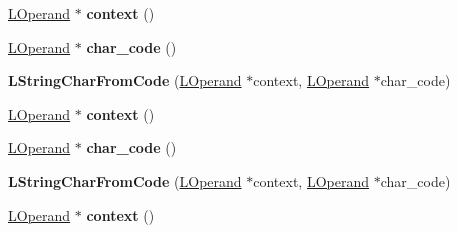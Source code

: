 \begin{DoxyCompactItemize}
\item 
\hyperlink{classv8_1_1internal_1_1_l_operand}{L\+Operand} $\ast$ {\bfseries context} ()\hypertarget{classv8_1_1internal_1_1_l_string_char_from_code_a4356472324b4b7a5d7ffebc9b5db601a}{}\label{classv8_1_1internal_1_1_l_string_char_from_code_a4356472324b4b7a5d7ffebc9b5db601a}

\item 
\hyperlink{classv8_1_1internal_1_1_l_operand}{L\+Operand} $\ast$ {\bfseries char\+\_\+code} ()\hypertarget{classv8_1_1internal_1_1_l_string_char_from_code_a93cc7e1f404a16531d549201415f09e1}{}\label{classv8_1_1internal_1_1_l_string_char_from_code_a93cc7e1f404a16531d549201415f09e1}

\item 
{\bfseries L\+String\+Char\+From\+Code} (\hyperlink{classv8_1_1internal_1_1_l_operand}{L\+Operand} $\ast$context, \hyperlink{classv8_1_1internal_1_1_l_operand}{L\+Operand} $\ast$char\+\_\+code)\hypertarget{classv8_1_1internal_1_1_l_string_char_from_code_a0b0f2d230156e96656bb7d58558684a4}{}\label{classv8_1_1internal_1_1_l_string_char_from_code_a0b0f2d230156e96656bb7d58558684a4}

\item 
\hyperlink{classv8_1_1internal_1_1_l_operand}{L\+Operand} $\ast$ {\bfseries context} ()\hypertarget{classv8_1_1internal_1_1_l_string_char_from_code_a4356472324b4b7a5d7ffebc9b5db601a}{}\label{classv8_1_1internal_1_1_l_string_char_from_code_a4356472324b4b7a5d7ffebc9b5db601a}

\item 
\hyperlink{classv8_1_1internal_1_1_l_operand}{L\+Operand} $\ast$ {\bfseries char\+\_\+code} ()\hypertarget{classv8_1_1internal_1_1_l_string_char_from_code_a93cc7e1f404a16531d549201415f09e1}{}\label{classv8_1_1internal_1_1_l_string_char_from_code_a93cc7e1f404a16531d549201415f09e1}

\item 
{\bfseries L\+String\+Char\+From\+Code} (\hyperlink{classv8_1_1internal_1_1_l_operand}{L\+Operand} $\ast$context, \hyperlink{classv8_1_1internal_1_1_l_operand}{L\+Operand} $\ast$char\+\_\+code)\hypertarget{classv8_1_1internal_1_1_l_string_char_from_code_a0b0f2d230156e96656bb7d58558684a4}{}\label{classv8_1_1internal_1_1_l_string_char_from_code_a0b0f2d230156e96656bb7d58558684a4}

\item 
\hyperlink{classv8_1_1internal_1_1_l_operand}{L\+Operand} $\ast$ {\bfseries context} ()\hypertarget{classv8_1_1internal_1_1_l_string_char_from_code_a4356472324b4b7a5d7ffebc9b5db601a}{}\label{classv8_1_1internal_1_1_l_string_char_from_code_a4356472324b4b7a5d7ffebc9b5db601a}


\end{DoxyCompactItemize}
